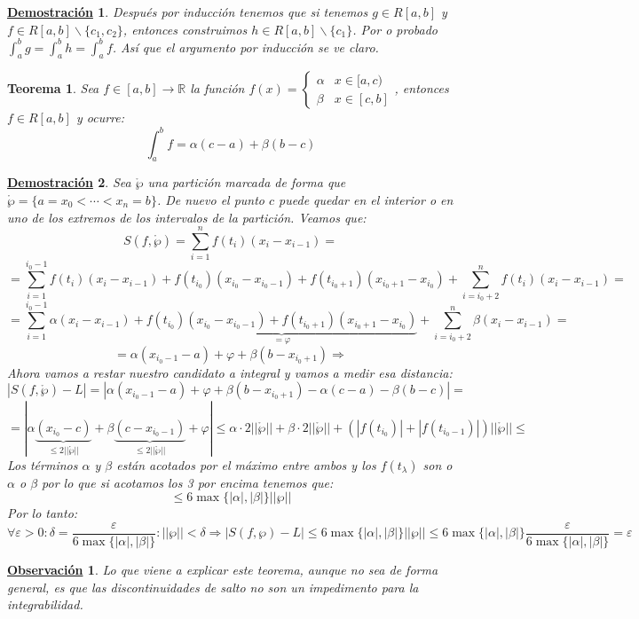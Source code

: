 \documentclass[10pt,a4paper,openright]{book}
\theoremstyle{break}
\newtheorem{theo}{Teorema}[chapter]
\newtheorem*{demo}{\underline{Demostración}}
\newtheorem{obs}{\underline{Observación}}[chapter]
\begin{document}
\begin{demo}
Después por inducción tenemos que si tenemos $g\in R[a,b]$ y $f\in R[a,b]\backslash\{c_1, c_2\}$, entonces construimos $h\in R[a,b]\backslash\{c_1\}$. Por o probado $\int_a^b g = \int_a^b h= \int_a^b f$. Así que el argumento por inducción se ve claro.
\end{demo}

\begin{theo}
Sea $f\in[a,b]\rightarrow \mathbb R$ la función $f(x)=\begin{cases}\alpha & x\in [a,c) \\ \beta & x\in [c,b]\end{cases}$, entonces $f\in R[a,b]$ y ocurre:
$$\int_a^b f = \alpha (c-a)+\beta(b-c)$$
\end{theo}
\begin{demo}
Sea $\mathring{\wp}$ una partición marcada de forma que $\mathring{\wp} = \{a=x_0 < \cdots <x_n = b\}$. De nuevo el punto $c$ puede quedar en el interior o en uno de los extremos de los intervalos de la partición. Veamos que:
$$S(f,\mathring{\wp}) = \sum_{i=1}^n f(t_i)(x_i-x_{i-1}) = $$
$$=\sum_{i=1}^{i_0-1}f(t_i)(x_i-x_{i-1})+f(t_{i_0})(x_{i_0}-x_{i_0-1})+ f(t_{i_0+1})(x_{i_0+1}-x_{i_0})+\sum_{i=i_0+2}^n f(t_i)(x_i-x_{i-1}) = $$
$$= \sum_{i=1}^{i_0-1}\alpha(x_i-x_{i-1})+\underbrace{f(t_{i_0})(x_{i_0}-x_{i_0-1})+ f(t_{i_0+1})(x_{i_0+1}-x_{i_0})}_{=\varphi}+\sum_{i=i_0+2}^n \beta(x_i-x_{i-1})=$$
$$=\alpha(x_{i_0-1}-a)+\varphi+\beta(b-x_{i_0+1})\Rightarrow $$
Ahora vamos a restar nuestro candidato a integral y vamos a medir esa distancia:
$$\left|S(f,\mathring{\wp})-L \right| =\left|\alpha(x_{i_0-1}-a)+\varphi + \beta(b-x_{i_0+1})-\alpha (c-a)-\beta (b-c)\right| = $$
$$=\left| \alpha \underbrace{(x_{i_0}-c)}_{\leq 2||\mathring{\wp}||}+\beta \underbrace{(c-x_{i_0-1})}_{\leq 2||\mathring{\wp}||} + \varphi\right| \leq \alpha\cdot 2||\mathring{\wp}||+ \beta \cdot 2||\mathring{\wp}|| + \left( |f(t_{i_0})|+|f(t_{i_0-1})| \right)||\mathring{\wp}|| \leq$$
Los términos $\alpha$ y $\beta$ están acotados por el máximo entre ambos y los $f(t_\lambda)$ son o $\alpha$ o $\beta$ por lo que si acotamos los 3 por encima tenemos que:
$$\leq 6 \max\{|\alpha|,|\beta|\}||\wp||$$
Por lo tanto:
$$\forall \varepsilon >0 : \delta = \frac{\varepsilon}{6\max\{|\alpha|, |\beta|\}}: ||\wp||<\delta\Rightarrow \left|S(f,\wp)-L\right|\leq 6 \max\{|\alpha|,|\beta|\}||\wp|| \leq 6 \max\{|\alpha|,|\beta|\} \frac{\varepsilon}{6\max\{|\alpha|, |\beta|\}} = \varepsilon$$
\end{demo}

\begin{obs}
Lo que viene a explicar este teorema, aunque no sea de forma general, es que las discontinuidades de salto no son un impedimento para la integrabilidad.
\end{obs}
\end{document}
